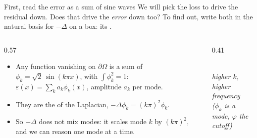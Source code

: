 \documentclass[11pt,aspectratio=169]{beamer}
\begin{document}
\begin{frame}{First, read the error as a sum of sine waves}
  We will pick the loss to drive the residual down. Does that drive the
  \emph{error} down too? To find out, write both in the natural basis for
  $-\Delta$ on a box: its .
  \smallskip
  \begin{columns}[c]
    \begin{column}{0.57\textwidth}
      \begin{itemize}\itemsep0.5em
        \item Any function vanishing on $\partial\Omega$ is a sum of  $\phi_k = \sqrt{2}\,\sin(k\pi x)$, with $\int \phi_k^2 = 1$:
              $\varepsilon(x) = \sum_k a_k \phi_k(x)$, amplitude $a_k$ per mode.
        \item They are the  of the Laplacian,
              $-\Delta \phi_k = (k\pi)^2 \phi_k$.
        \item So $-\Delta$ does not mix modes: it scales mode $k$ by $(k\pi)^2$,
              and we can reason one mode at a time.
      \end{itemize}
    \end{column}
    \begin{column}{0.41\textwidth}
      \centering
      \\[3pt]
      {\small\itshape\color{neutral} higher $k$, higher frequency\\
       ($\phi_k$ is a mode, $\varphi$ the cutoff)}
    \end{column}
  \end{columns}
\end{frame}
\end{document}
